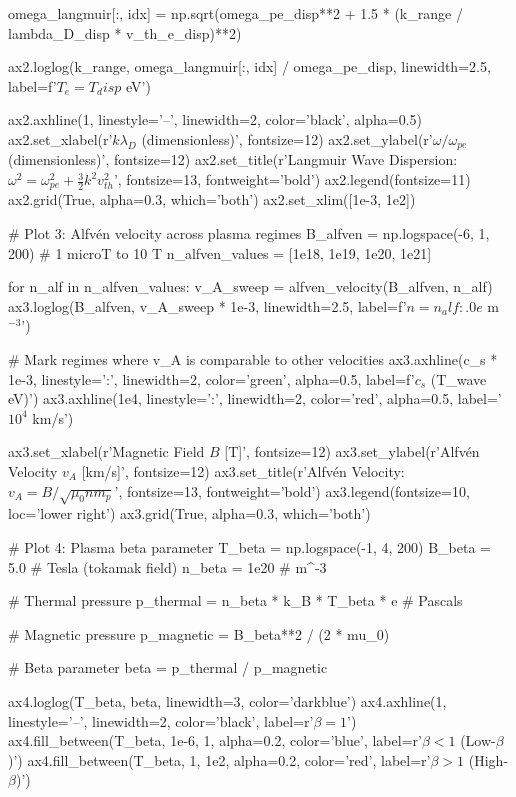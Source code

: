 \documentclass[11pt,a4paper]{article}
\begin{document}
\begin{pycode}
    omega_langmuir[:, idx] = np.sqrt(omega_pe_disp**2 + 1.5 * (k_range / lambda_D_disp * v_th_e_disp)**2)

    ax2.loglog(k_range, omega_langmuir[:, idx] / omega_pe_disp, linewidth=2.5,
              label=f'$T_e = {T_disp}$ eV')

ax2.axhline(1, linestyle='--', linewidth=2, color='black', alpha=0.5)
ax2.set_xlabel(r'$k\lambda_D$ (dimensionless)', fontsize=12)
ax2.set_ylabel(r'$\omega / \omega_{pe}$ (dimensionless)', fontsize=12)
ax2.set_title(r'Langmuir Wave Dispersion: $\omega^2 = \omega_{pe}^2 + \frac{3}{2}k^2 v_{th}^2$',
             fontsize=13, fontweight='bold')
ax2.legend(fontsize=11)
ax2.grid(True, alpha=0.3, which='both')
ax2.set_xlim([1e-3, 1e2])

# Plot 3: Alfvén velocity across plasma regimes
B_alfven = np.logspace(-6, 1, 200)  # 1 microT to 10 T
n_alfven_values = [1e18, 1e19, 1e20, 1e21]

for n_alf in n_alfven_values:
    v_A_sweep = alfven_velocity(B_alfven, n_alf)
    ax3.loglog(B_alfven, v_A_sweep * 1e-3, linewidth=2.5, label=f'$n = {n_alf:.0e}$ m$^{{-3}}$')

# Mark regimes where v_A is comparable to other velocities
ax3.axhline(c_s * 1e-3, linestyle=':', linewidth=2, color='green', alpha=0.5,
           label=f'$c_s$ ({T_wave} eV)')
ax3.axhline(1e4, linestyle=':', linewidth=2, color='red', alpha=0.5,
           label='$10^4$ km/s')

ax3.set_xlabel(r'Magnetic Field $B$ [T]', fontsize=12)
ax3.set_ylabel(r'Alfv\'en Velocity $v_A$ [km/s]', fontsize=12)
ax3.set_title(r'Alfv\'en Velocity: $v_A = B/\sqrt{\mu_0 n m_p}$', fontsize=13, fontweight='bold')
ax3.legend(fontsize=10, loc='lower right')
ax3.grid(True, alpha=0.3, which='both')

# Plot 4: Plasma beta parameter
T_beta = np.logspace(-1, 4, 200)
B_beta = 5.0  # Tesla (tokamak field)
n_beta = 1e20  # m^-3

# Thermal pressure
p_thermal = n_beta * k_B * T_beta * e  # Pascals

# Magnetic pressure
p_magnetic = B_beta**2 / (2 * mu_0)

# Beta parameter
beta = p_thermal / p_magnetic

ax4.loglog(T_beta, beta, linewidth=3, color='darkblue')
ax4.axhline(1, linestyle='--', linewidth=2, color='black', label=r'$\beta = 1$')
ax4.fill_between(T_beta, 1e-6, 1, alpha=0.2, color='blue', label=r'$\beta < 1$ (Low-$\beta$)')
ax4.fill_between(T_beta, 1, 1e2, alpha=0.2, color='red', label=r'$\beta > 1$ (High-$\beta$)')


\end{pycode}
\end{document}
